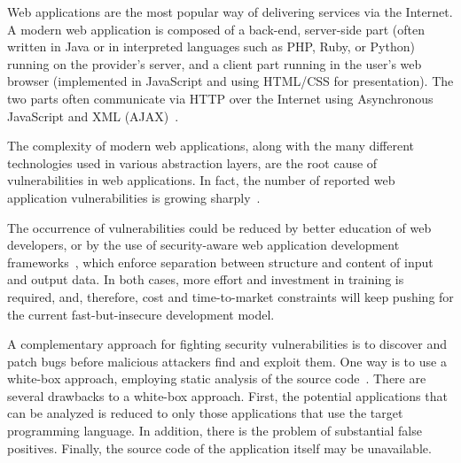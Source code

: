 


Web applications are the most popular way of delivering services via the
Internet. A modern web application is composed of a back-end, server-side part
(often written in Java or in interpreted languages such as PHP, Ruby, or
Python) running on the provider's server, and a client part running in the
user's web browser (implemented in JavaScript and using HTML/CSS for
presentation). The two parts often communicate via HTTP over the Internet using
Asynchronous JavaScript and XML (AJAX)~\cite{garrett05:ajax}.

The complexity of modern web applications, along with the many different
technologies used in various abstraction layers, are the root cause of
vulnerabilities in web applications. In fact, the number of reported web
application vulnerabilities is growing sharply~\cite{steve07,
  fossi09:symantec}.

The occurrence of vulnerabilities could be reduced by better education of web
developers, or by the use of security-aware web application development
frameworks~\cite{robertson09, chong07}, which enforce separation between
structure and content of input and output data. In both cases, more effort and
investment in training is required, and, therefore, cost and time-to-market
constraints will keep pushing for the current fast-but-insecure development
model.

A complementary approach for fighting security vulnerabilities is to discover and
patch bugs before malicious attackers find and exploit them. One way is to use
a white-box approach, employing static analysis of the source
code~\cite{felmetsger10:logic,huang03:web,jovanovic10:static,balzarotti08:saner}.
There are several drawbacks to a white-box approach. First, the potential
applications that can be analyzed is reduced to only those applications that
use the target programming language. In addition, there is the problem of
substantial false positives. Finally, the source code of the
application itself may be unavailable.

